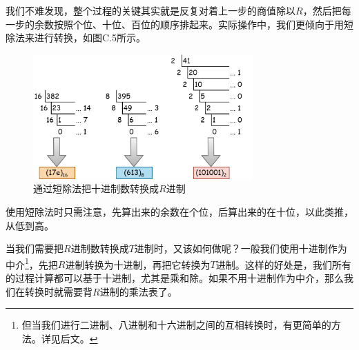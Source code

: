 我们不难发现，整个过程的关键其实就是反复对着上一步的商值除以$R$，然后把每一步的余数按照个位、十位、百位的顺序排起来。实际操作中，我们更倾向于用短除法来进行转换，如图C.5所示。\par
\begin{figure}[htbp]
    \centering
    \includegraphics[width=0.75\textwidth]{../images/other_parts/C_short_division.drawio.png}
    \caption{通过短除法把十进制数转换成$R$进制}
\end{figure}
使用短除法时只需注意，先算出来的余数在个位，后算出来的在十位，以此类推，从低到高。\par
当我们需要把$R$进制数转换成$T$进制时，又该如何做呢？一般我们使用十进制作为中介\footnote{但当我们进行二进制、八进制和十六进制之间的互相转换时，有更简单的方法。详见后文。}，先把$R$进制转换为十进制，再把它转换为$T$进制。这样的好处是，我们所有的过程计算都可以基于十进制，尤其是乘和除。如果不用十进制作为中介，那么我们在转换时就需要背$R$进制的乘法表了。\par
